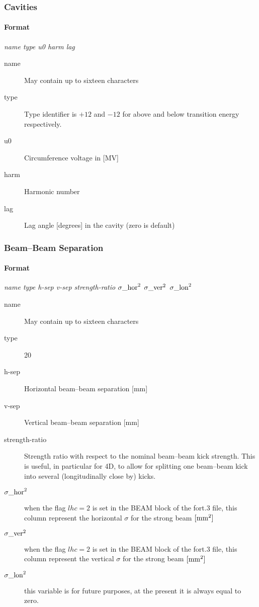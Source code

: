 \documentclass[a4paper,11pt]{report}
\begin{document}
\subsubsection{Cavities} \label{Cavities}
\paragraph{Format} {\em name type u0 harm lag}
\begin{description}
\item [name] May contain up to sixteen characters
\item [type] Type identifier is $+12$ and $-12$ for above and below
  transition energy respectively.
\item [u0] Circumference voltage in [MV]
\item [harm] Harmonic number
\item [lag] Lag angle [degrees] in the cavity (zero is default)
\end{description}

\subsubsection{Beam--Beam Separation} \label{BBS}
\paragraph{Format} {\em name type h-sep v-sep strength-ratio ${\sigma\_\rm{hor}}^2$ ${\sigma\_\rm{ver}}^2$ ${\sigma\_\rm{lon}}^2$}
\begin{description}
\item [name] May contain up to sixteen characters
\item [type] 20
\item [h-sep] Horizontal beam--beam separation [mm]
\item [v-sep] Vertical beam--beam separation [mm]
\item [strength-ratio] Strength ratio with respect to the nominal
  beam--beam kick strength. This is useful, in particular for 4D, to
  allow for splitting one beam--beam kick into several (longitudinally
  close by) kicks.
\item [${\sigma\_\rm{hor}}^2$] when the flag $lhc=2$ is set in the BEAM block of the fort.3 file, this column represent the horizontal $\sigma$ for the strong beam $\rm{[mm^2]}$
\item [${\sigma\_\rm{ver}}^2$] when the flag $lhc=2$ is set in the BEAM block of the fort.3 file, this column represent the vertical $\sigma$ for the strong beam $\rm{[mm^2]}$
\item [${\sigma\_\rm{lon}}^2$] this variable is for future purposes, at the present it is always equal to zero.

\end{description}
\end{document}
